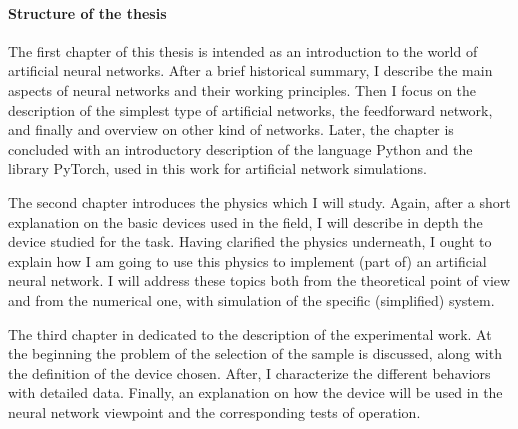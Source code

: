 
\paragraph{Structure of the thesis\\}

The first chapter of this thesis is intended as an introduction to the world of artificial neural networks.
After a brief historical summary, I describe the main aspects of neural networks and their working principles.
Then I focus on the description of the simplest type of artificial networks, the feedforward network, and finally and overview on other kind of networks.
Later, the chapter is concluded with an introductory description of the language Python and the library PyTorch, used in this work for artificial network simulations.

The second chapter introduces the physics which I will study.
Again, after a short explanation on the basic devices used in the field, I will describe in depth the device studied for the task.
Having clarified the physics underneath, I ought to explain how I am going to use this physics to implement (part of) an artificial neural network.
I will address these topics both from the theoretical point of view and from the numerical one, with simulation of the specific (simplified) system.

The third chapter in dedicated to the description of the experimental work.
At the beginning the problem of the selection of the sample is discussed, along with the definition of the device chosen.
After, I characterize the different behaviors with detailed data.
Finally, an explanation on how the device will be used in the neural network viewpoint and the corresponding tests of operation.